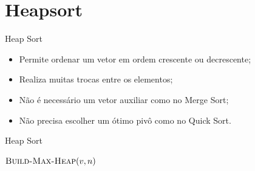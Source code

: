 \documentclass[t, 10pt]{beamer}
\begin{document}
  \section{Heapsort}
  \begin{frame}{Heap Sort}
    \begin{itemize}
      \item Permite ordenar um vetor em ordem crescente ou decrescente;
      \item Realiza muitas trocas entre os elementos;
      \item Não é necessário um vetor auxiliar como no Merge Sort;
      \item Não precisa escolher um ótimo pivô como no Quick Sort.
    \end{itemize}
  \end{frame}

  \begin{frame}[c]{Heap Sort}
    \begin{center}
    \begin{minipage}{0.61\textwidth}
    \begin{algorithm}[H]
      \caption{$\textsc{Heapsort}(v,n)$}
      $\textsc{Build-Max-Heap}(v,n)$ \\
    \end{algorithm}
    \end{minipage}
    \end{center}
  \end{frame}
\end{document}
